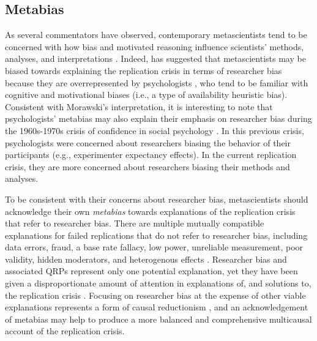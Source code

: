 \documentclass[authordate, meta]{jote-new-article}
\begin{document}
\subsection{Metabias}



As several commentators have observed, contemporary metascientists tend to be concerned with how bias and motivated reasoning influence scientists’ methods, analyses, and interpretations \parencites{Field2021}{Flis2019}{Morawski2019}{Morawski2022}[p. 7]{Peterson2020}[for examples, see][]{Bishop2020}[chapter 1]{Chambers2017}{Chambers2022}{Hardwicke2023}{Ioannidis2014}{Munafò2017}{Nosek2012}[p. 153]{Simmons2021}. Indeed, \textcite{Morawski2022} has suggested that metascientists may be biased towards explaining the replication crisis in terms of researcher bias because they are overrepresented by psychologists \parencites{Moody2022}[see also][]{Flis2019}{Malich2022}, who tend to be familiar with cognitive and motivational biases (i.e., a type of availability heuristic bias). Consistent with Morawski’s interpretation, it is interesting to note that psychologists’ metabias may also explain their emphasis on researcher bias during the 1960s-1970s crisis of confidence in social psychology \parencites[p. 600]{Peterson2021}{Rosnow1983}. In this previous crisis, psychologists were concerned about researchers biasing the behavior of their participants (e.g., experimenter expectancy effects). In the current replication crisis, they are more concerned about researchers biasing their methods and analyses.



To be consistent with their concerns about researcher bias, metascientists should acknowledge their own \emph{metabias} towards explanations of the replication crisis that refer to researcher bias. There are multiple mutually compatible explanations for failed replications that do not refer to researcher bias, including data errors, fraud, a base rate fallacy, low power, unreliable measurement, poor validity, hidden moderators, and heterogenous effects \parencites[e.g.,][]{Bird2020}{Boeck2018}{Fabrigar2020}{Maxwell2015}{Rubin2021a}{Stanley2014}. Researcher bias and associated QRPs represent only one potential explanation, yet they have been given a disproportionate amount of attention in explanations of, and solutions to, the replication crisis \parencites[e.g.,][]{Hardwicke2023}{Munafò2017}[p. 372]{Schimmack2020}. Focusing on researcher bias at the expense of other viable explanations represents a form of causal reductionism \parencites[p. 17]{Devezer2019}, and an acknowledgement of metabias may help to produce a more balanced and comprehensive multicausal account of the replication crisis.
\end{document}

